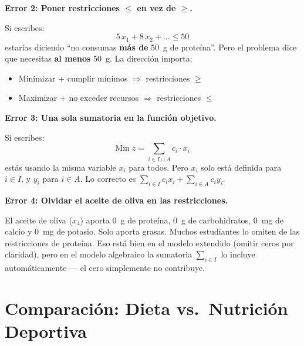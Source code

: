 \documentclass[12pt]{article}
\begin{document}
\begin{cajaroja}
\textbf{Error 2: Poner restricciones $\leq$ en vez de $\geq$.}

Si escribes:
\[
    5\,x_1 + 8\,x_2 + \ldots \leq 50
\]
estar\'ias diciendo ``no consumas \textbf{m\'as de} 50~g de prote\'ina''. Pero el problema dice que necesitas \textbf{al menos} 50~g. La direcci\'on importa:
\begin{itemize}
    \item Minimizar + cumplir m\'inimos $\Rightarrow$ restricciones $\geq$
    \item Maximizar + no exceder recursos $\Rightarrow$ restricciones $\leq$
\end{itemize}
\end{cajaroja}

\begin{cajaroja}
\textbf{Error 3: Una sola sumatoria en la funci\'on objetivo.}

Si escribes:
\[
    \text{Min}\; z = \sum_{i \in I \cup A} c_i \cdot x_i
\]
est\'as usando la misma variable $x_i$ para todos. Pero $x_i$ solo est\'a definida para $i \in I$, y $y_i$ para $i \in A$. Lo correcto es $\sum_{i \in I} c_i x_i + \sum_{i \in A} c_i y_i$.
\end{cajaroja}

\begin{cajaroja}
\textbf{Error 4: Olvidar el aceite de oliva en las restricciones.}

El aceite de oliva ($x_4$) aporta 0~g de prote\'ina, 0~g de carbohidratos, 0~mg de calcio y 0~mg de potasio. Solo aporta grasas. Muchos estudiantes lo omiten de las restricciones de prote\'ina. Eso est\'a bien en el modelo extendido (omitir ceros por claridad), pero en el modelo algebraico la sumatoria $\sum_{i \in I}$ lo incluye autom\'aticamente --- el cero simplemente no contribuye.
\end{cajaroja}

\section{Comparaci\'on: Dieta vs.\ Nutrici\'on Deportiva}
\end{document}
